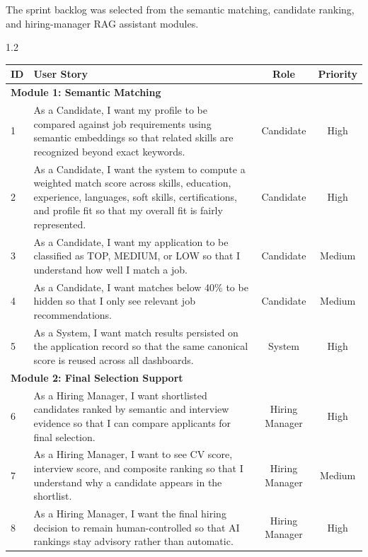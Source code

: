 The sprint backlog was selected from the semantic matching, candidate ranking, and hiring-manager RAG assistant modules.

\begin{spacing}{1.2}
\begin{center}
\label{tab:sprint3_backlog}
\begin{tabularx}{\textwidth}{|l|X|c|c|}
\hline
\rowcolor{gray!20} \textbf{ID} & \textbf{User Story} & \textbf{Role} & \textbf{Priority} \\ \hline

\multicolumn{4}{|l|}{\cellcolor{gray!10}\textbf{Module 1: Semantic Matching}} \\ \hline
1 & As a Candidate, I want my profile to be compared against job requirements using semantic embeddings so that related skills are recognized beyond exact keywords. & Candidate & High \\ \hline
2 & As a Candidate, I want the system to compute a weighted match score across skills, education, experience, languages, soft skills, certifications, and profile fit so that my overall fit is fairly represented. & Candidate & High \\ \hline
3 & As a Candidate, I want my application to be classified as TOP, MEDIUM, or LOW so that I understand how well I match a job. & Candidate & Medium \\ \hline
4 & As a Candidate, I want matches below 40\% to be hidden so that I only see relevant job recommendations. & Candidate & Medium \\ \hline
5 & As a System, I want match results persisted on the application record so that the same canonical score is reused across all dashboards. & System & High \\ \hline

\multicolumn{4}{|l|}{\cellcolor{gray!10}\textbf{Module 2: Final Selection Support}} \\ \hline
6 & As a Hiring Manager, I want shortlisted candidates ranked by semantic and interview evidence so that I can compare applicants for final selection. & Hiring Manager & High \\ \hline
7 & As a Hiring Manager, I want to see CV score, interview score, and composite ranking so that I understand why a candidate appears in the shortlist. & Hiring Manager & Medium \\ \hline
8 & As a Hiring Manager, I want the final hiring decision to remain human-controlled so that AI rankings stay advisory rather than automatic. & Hiring Manager & High \\ \hline


\end{tabularx}
\end{center}
\end{spacing}
